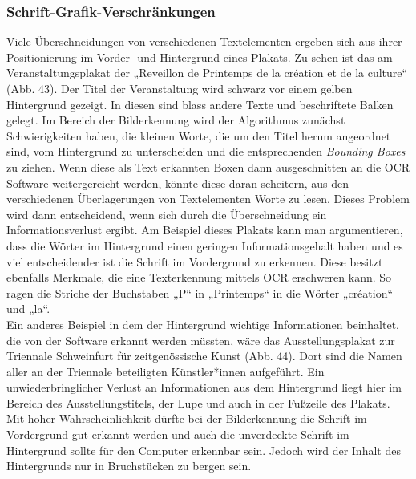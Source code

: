 \documentclass[a4paper,12pt,ngerman]{article}
\begin{document}
\subsubsection{Schrift-Grafik-Verschränkungen}
Viele Überschneidungen von verschiedenen Textelementen ergeben sich aus ihrer Positionierung im Vorder- und Hintergrund eines Plakats. Zu sehen ist das am Veranstaltungsplakat der „Reveillon de Printemps de la création et de la culture“ (Abb. 43). Der Titel der Veranstaltung wird schwarz vor einem gelben Hintergrund gezeigt. In diesen sind blass andere Texte und beschriftete Balken gelegt. Im Bereich der Bilderkennung wird der Algorithmus zunächst Schwierigkeiten haben, die kleinen Worte, die um den Titel herum angeordnet sind, vom Hintergrund zu unterscheiden und die entsprechenden \textit{Bounding Boxes} zu ziehen. Wenn diese als Text erkannten Boxen dann ausgeschnitten an die OCR Software weitergereicht werden, könnte diese daran scheitern, aus den verschiedenen Überlagerungen von Textelementen Worte zu lesen. Dieses Problem wird dann entscheidend, wenn sich durch die Überschneidung ein Informationsverlust ergibt. Am Beispiel dieses Plakats kann man argumentieren, dass die Wörter im Hintergrund einen geringen Informationsgehalt haben und es viel entscheidender ist die Schrift im Vordergrund zu erkennen. Diese besitzt ebenfalls Merkmale, die eine Texterkennung mittels OCR erschweren kann. So ragen die Striche der Buchstaben „P“ in „Printemps“ in die Wörter „création“ und „la“.\\
Ein anderes Beispiel in dem der Hintergrund wichtige Informationen beinhaltet, die von der Software erkannt werden müssten, wäre das Ausstellungsplakat zur Triennale Schweinfurt für zeitgenössische Kunst (Abb. 44). Dort sind die Namen aller an der Triennale beteiligten Künstler*innen aufgeführt. Ein unwiederbringlicher Verlust an Informationen aus dem Hintergrund liegt hier im Bereich des Ausstellungstitels, der Lupe und auch in der Fußzeile des Plakats. Mit hoher Wahrscheinlichkeit dürfte bei der Bilderkennung die Schrift im Vordergrund gut erkannt werden und auch die unverdeckte Schrift im Hintergrund sollte für den Computer erkennbar sein. Jedoch wird der Inhalt des Hintergrunds nur in Bruchstücken zu bergen sein.\\
\end{document}
